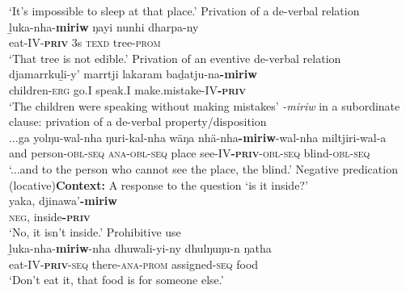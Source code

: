 \documentclass[output=paper]{langsci/langscibook}
\begin{document}
\begin{exe}
\begin{xlist}
\glt `It's impossible to sleep at that place.' \hfill \citep[448]{Wilkinson1991}
%
\ex\label{ex:austr-djamb-range-edible} Privation of a de-verbal relation\\ 
\gll ḻuka-nha-\textbf{miriw} ŋayi nunhi dharpa-ny\\
eat-IV-\textsc{\textbf{priv}} 3s \textsc{texd} tree-\textsc{prom}\\
\glt `That tree is not edible.' \hfill \citep[446]{Wilkinson1991}
%
\ex Privation of an eventive de-verbal relation\\
\gll djamarrkuḻi-y' marrtji lakaram baḏatju-na\textbf{-miriw}\\
children-\textsc{erg} go.I speak.I make.mistake-IV\textsc{\textbf{-priv}}	\\
\glt  `The children were speaking without making mistakes' \hfill \citep[449]{Wilkinson1991}
%
\ex \emph{-miriw} in a subordinate clause: privation of a de-verbal property\slash disposition\\
\gll ...ga yolŋu-wal-nha ŋuri-kal-nha wäŋa nhä-nha\textbf{-miriw}-wal-nha miltjiri-wal-a   \\
and person\textsc{-\textsc{obl}-seq} \textsc{ana-obl-seq} place see-IV\textbf{-\textsc{priv}}-\textsc{obl-seq} blind\textsc{-obl-seq}	\\
\glt `...and to the person who cannot see the place, the blind.' 			 \hfill \citep[448]{Wilkinson1991}
%
\ex Negative predication (locative)\qquad \textbf{Context:} A response to the question `is it inside?'\\
\gll yaka, djinawa'\textbf{-miriw}\\
\textsc{neg}, inside\textsc{\textbf{-priv}}\\
\glt `No, it isn't inside.' \hfill \citep[445]{Wilkinson1991}
%
\ex Prohibitive use\label{ex:austr-djamb-range-food}\\
\gll ḻuka-nha-\textbf{miriw}-nha dhuwali-yi-ny dhulŋuŋu-n ŋatha\\
eat-IV-\textsc{\textbf{priv}}-\textsc{seq} there-\textsc{ana}-\textsc{prom} assigned-\textsc{seq} food\\
\glt `Don't eat it, that food is for someone else.' \hfill \citep[446]{Wilkinson1991}
    \end{xlist}\end{exe}
\end{document}

